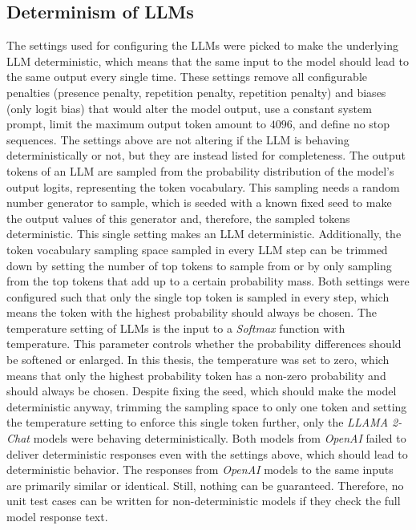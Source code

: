 \documentclass[draft,final]{thesisclass} %
\begin{document}
\subsection{Determinism of \gls{LLM}s}
The settings used for configuring the \gls{LLM}s were picked to make the underlying \gls{LLM} deterministic, which means that the same input to the model should lead to the same output every single time.
These settings remove all configurable penalties (presence penalty, repetition penalty, repetition penalty) and biases (only logit bias) that would alter the model output, use a constant system prompt, limit the maximum output token amount to $4096$, and define no stop sequences.
The settings above are not altering if the \gls{LLM} is behaving deterministically or not, but they are instead listed for completeness.
The output tokens of an \gls{LLM} are sampled from the probability distribution of the model's output logits, representing the token vocabulary.
This sampling needs a random number generator to sample, which is seeded with a known fixed seed to make the output values of this generator and, therefore, the sampled tokens deterministic.
This single setting makes an \gls{LLM} deterministic.
Additionally, the token vocabulary sampling space sampled in every \gls{LLM} step can be trimmed down by setting the number of top tokens to sample from or by only sampling from the top tokens that add up to a certain probability mass.
Both settings were configured such that only the single top token is sampled in every step, which means the token with the highest probability should always be chosen.
The temperature setting of \gls{LLM}s is the input to a \textit{Softmax} function with temperature. This parameter controls whether the probability differences should be softened or enlarged.
In this thesis, the temperature was set to zero, which means that only the highest probability token has a non-zero probability and should always be chosen.
Despite fixing the seed, which should make the model deterministic anyway, trimming the sampling space to only one token and setting the temperature setting to enforce this single token further, only the \textit{LLAMA 2-Chat} models were behaving deterministically.
Both models from \textit{OpenAI} failed to deliver deterministic responses even with the settings above, which should lead to deterministic behavior.
The responses from \textit{OpenAI} models to the same inputs are primarily similar or identical. Still, nothing can be guaranteed. Therefore, no unit test cases can be written for non-deterministic models if they check the full model response text.
\end{document}
